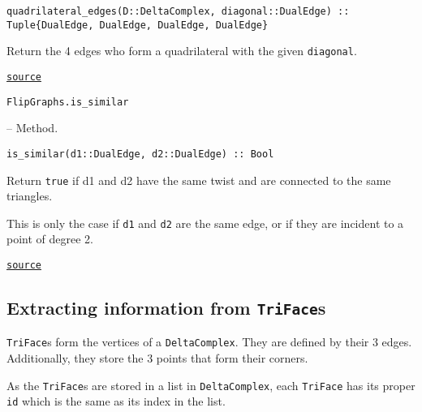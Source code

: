 \begin{adjustwidth}{2em}{0pt}


\begin{verbatim}
quadrilateral_edges(D::DeltaComplex, diagonal::DualEdge) :: Tuple{DualEdge, DualEdge, DualEdge, DualEdge}
\end{verbatim}

Return the 4 edges who form a quadrilateral with the given \texttt{diagonal}.



\href{https://github.com/schto223/FlipGraphs.jl/blob/490c01a7adf74b42f27dda05099165c47ae8133e/src/deltaComplex.jl#L980-L984}{\texttt{source}}


\end{adjustwidth}
\hypertarget{18090201370347779315}{\texttt{FlipGraphs.is\_similar}}  -- {Method.}

\begin{adjustwidth}{2em}{0pt}


\begin{verbatim}
is_similar(d1::DualEdge, d2::DualEdge) :: Bool
\end{verbatim}

Return \texttt{true} if d1 and d2 have the same twist and are connected to the same triangles.

This is only the case if \texttt{d1} and \texttt{d2} are the same edge, or if they are incident to a point of degree 2.



\href{https://github.com/schto223/FlipGraphs.jl/blob/490c01a7adf74b42f27dda05099165c47ae8133e/src/deltaComplex.jl#L141-L147}{\texttt{source}}


\end{adjustwidth}

\subsection{Extracting information from \texttt{TriFace}s}



\label{17925776943648899087}{}


\texttt{TriFace}s form the vertices of a \texttt{DeltaComplex}. They are defined by their 3 edges. Additionally, they store the 3 points that form their corners.



As the \texttt{TriFace}s are stored in a list in \texttt{DeltaComplex}, each \texttt{TriFace} has its proper \texttt{id} which is the same as its index in the list.


